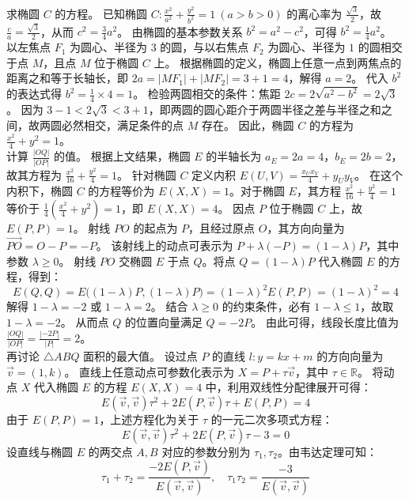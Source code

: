 \begin{solution}
求椭圆 $C$ 的方程。
已知椭圆 $C: \frac{x^2}{a^2} + \frac{y^2}{b^2} = 1\ (a > b > 0)$ 的离心率为 $\frac{\sqrt{3}}{2}$，故 $\frac{c}{a} = \frac{\sqrt{3}}{2}$，从而 $c^2 = \frac{3}{4}a^2$。
由椭圆的基本参数关系 $b^2 = a^2 - c^2$，可得 $b^2 = \frac{1}{4}a^2$。
以左焦点 $F_1$ 为圆心、半径为 $3$ 的圆，与以右焦点 $F_2$ 为圆心、半径为 $1$ 的圆相交于点 $M$，且点 $M$ 位于椭圆 $C$ 上。
根据椭圆的定义，椭圆上任意一点到两焦点的距离之和等于长轴长，即 $2a = |MF_1| + |MF_2| = 3 + 1 = 4$，解得 $a = 2$。
代入 $b^2$ 的表达式得 $b^2 = \frac{1}{4} \times 4 = 1$。
检验两圆相交的条件：焦距 $2c = 2\sqrt{a^2 - b^2} = 2\sqrt{3}$。
因为 $3 - 1 < 2\sqrt{3} < 3 + 1$，即两圆的圆心距介于两圆半径之差与半径之和之间，故两圆必然相交，满足条件的点 $M$ 存在。
因此，椭圆 $C$ 的方程为 $\frac{x^2}{4} + y^2 = 1$。\\
计算 $\frac{|OQ|}{|OP|}$ 的值。
根据上文结果，椭圆 $E$ 的半轴长为 $a_E = 2a = 4$，$b_E = 2b = 2$，故其方程为 $\frac{x^2}{16} + \frac{y^2}{4} = 1$。
针对椭圆 $C$ 定义内积 $E(U,V)=\frac{x_Ux_V}{4}+y_Uy_V$。
在这个内积下，椭圆 $C$ 的方程等价为 $E(X, X) = 1$。对于椭圆 $E$，其方程 $\frac{x^2}{16} + \frac{y^2}{4} = 1$ 等价于 $\frac{1}{4}\left(\frac{x^2}{4} + y^2\right) = 1$，即 $E(X, X) = 4$。
因点 $P$ 位于椭圆 $C$ 上，故 $E(P, P) = 1$。
射线 $PO$ 的起点为 $P$，且经过原点 $O$，其方向向量为 $\overrightarrow{PO} = O - P = -P$。
该射线上的动点可表示为 $P + \lambda(-P) = (1 - \lambda)P$，其中参数 $\lambda \ge 0$。
射线 $PO$ 交椭圆 $E$ 于点 $Q$。将点 $Q = (1 - \lambda)P$ 代入椭圆 $E$ 的方程，得到：
$$ E(Q, Q) = E\big((1 - \lambda)P, (1 - \lambda)P\big) = (1 - \lambda)^2 E(P, P) = (1 - \lambda)^2 = 4 $$
解得 $1 - \lambda = -2$ 或 $1 - \lambda = 2$。
结合 $\lambda \ge 0$ 的约束条件，必有 $1 - \lambda \le 1$，故取 $1 - \lambda = -2$。
从而点 $Q$ 的位置向量满足 $Q = -2P$。
由此可得，线段长度比值为 $\frac{|OQ|}{|OP|} = \frac{|-2P|}{|P|} = 2$。\\
再讨论 $\triangle ABQ$ 面积的最大值。
设过点 $P$ 的直线 $l: y = kx + m$ 的方向向量为 $\vec{v} = (1, k)$。
直线上任意动点可参数化表示为 $X = P + \tau \vec{v}$，其中 $\tau \in \mathbb{R}$。
将动点 $X$ 代入椭圆 $E$ 的方程 $E(X, X) = 4$ 中，利用双线性分配律展开可得：
$$ E(\vec{v}, \vec{v})\tau^2 + 2E(P, \vec{v})\tau + E(P, P) = 4 $$
由于 $E(P, P) = 1$，上述方程化为关于 $\tau$ 的一元二次多项式方程：
$$ E(\vec{v}, \vec{v})\tau^2 + 2E(P, \vec{v})\tau - 3 = 0 $$
设直线与椭圆 $E$ 的两交点 $A, B$ 对应的参数分别为 $\tau_1, \tau_2$。由韦达定理可知：
$$ \tau_1 + \tau_2 = \frac{-2E(P, \vec{v})}{E(\vec{v}, \vec{v})}, \quad \tau_1 \tau_2 = \frac{-3}{E(\vec{v}, \vec{v})} $$

\end{solution}
